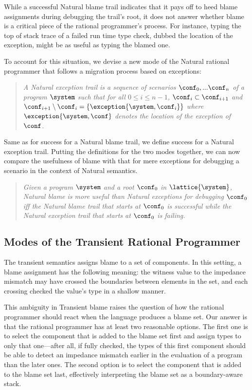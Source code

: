 While a successful Natural blame trail indicates that it 
pays off to heed blame assignments during debugging the trail's root, it does not answer whether
blame is a critical piece of the rational programmer's process.  For instance,
typing the top of stack trace of a failed run time type check, dubbed the
location of the exception, might be as useful as typing the blamed one.

To account for this situation, we devise a new mode of the Natural rational
programmer that follows a migration process based on exceptions:
\begin{quote}
\it A Natural exception trail is a sequence of scenarios $\conf_0,...\conf_n$ of a
program $\system$ such that for all $0 \leq i \leq n - 1$, $\conf_i \subset
\conf_{i+1}$ and $\conf_{i+1} \setminus \conf_i = \{\exception{\system, \conf_i}\}$
where $\exception{\system, \conf}$ denotes the location of the exception of $\conf$.
\end{quote}

Same as for success for a Natural blame trail, we define success for a
Natural exception trail.
Putting the definitions for the two modes together, we can now compare the usefulness of blame 
with that for mere exceptions for debugging a scenario in the context of Natural semantics.
\begin{quote}
\it 
  Given a program $\system$ and a root $\conf_0$ in $\lattice{\system}$,
  Natural blame is \emph{more useful} than Natural exceptions for
  debugging $\conf_0$ iff 
  the Natural blame trail 
  that starts at $\conf_0$ is successful while the Natural exception trail that
  starts at $\conf_0$ is failing.
\end{quote}

\subsection{Modes of the Transient Rational Programmer} \label{sub:transient}

The transient semantics assigns blame to a set of components. In this setting, a
blame assignment has the following meaning: the witness value to the impedance
mismatch may have crossed the boundaries between elements in the set, and each crossing
checked the value's type in a shallow manner. 

This ambiguity in Transient blame raises the question of how the rational programmer
should react when the language produces a blame set. Our answer is that the rational
programmer has at least two reasonable options. The first one is to select the component that is added
to the blame set first and assign types to only that one---after all, if
fully checked, the types of
this first component should be able to detect an impedance mismatch earlier in the
evaluation of a program than the later ones. The second option is to
select the component that is added to the blame set last, effectively
interpreting the blame set as a boundary-aware stack. 

